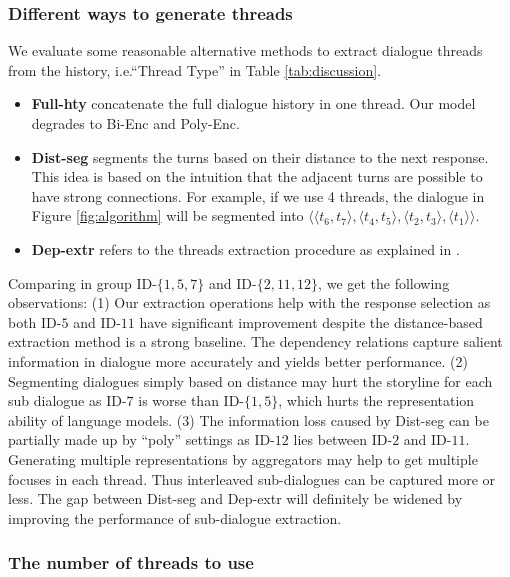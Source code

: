 \subsubsection{Different ways to generate threads}
\label{sec:ways}
We evaluate some reasonable alternative methods to extract dialogue threads
from the history, i.e.``Thread Type'' in Table \ref{tab:discussion}. 
\begin{itemize}
	\item \textbf{Full-hty} concatenate the full dialogue history in one thread. 
Our model degrades to Bi-Enc and Poly-Enc.
	\item \textbf{Dist-seg} segments the turns based on their distance to the next response. This idea is based on the intuition that the adjacent turns are possible to have strong connections. For example, if we use 4 threads, the dialogue in Figure \ref{fig:algorithm} will be segmented into $\langle\langle t_6, t_7\rangle, \langle t_4, t_5\rangle, \langle t_2, t_3\rangle, \langle t_1\rangle\rangle$.
	\item \textbf{Dep-extr} refers to the threads extraction procedure as explained in . %
\end{itemize}

Comparing in group ID-$\{1, 5, 7\}$ and ID-$\{2, 11, 12\}$, we get the following observations:
(1) Our extraction operations help with the response selection as both ID-$5$ and ID-$11$ have significant improvement despite the distance-based extraction method is a strong baseline. The dependency relations capture salient information in dialogue more accurately and yields better performance.
(2) Segmenting dialogues simply based on distance may hurt the storyline for each sub dialogue as ID-$7$ is worse than ID-$\{1, 5\}$, which hurts the representation ability of language models. 
(3) The information loss caused by Dist-seg can be partially made up by ``poly'' settings as ID-$12$ lies between ID-$2$ and ID-$11$. Generating multiple representations by aggregators may help to get multiple focuses in each thread. Thus interleaved sub-dialogues can be captured more or less. The gap between Dist-seg and Dep-extr will definitely be widened by improving the performance of sub-dialogue extraction. 


\subsubsection{The number of threads to use}
\label{sec:number}

